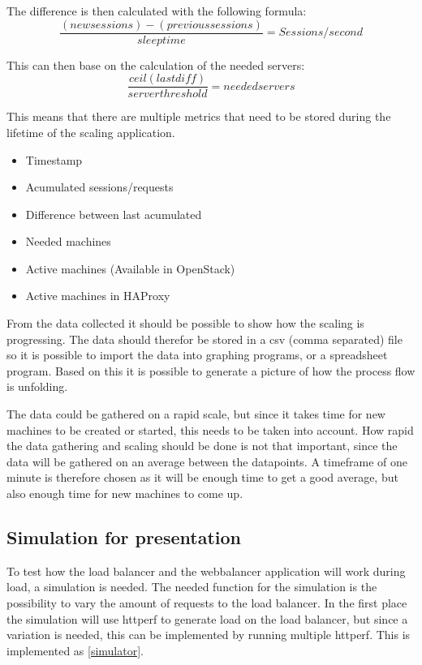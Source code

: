 The difference is then calculated with the following formula:
\begin{equation}
\frac{(newsessions) - (previoussessions)}{sleeptime} =
Sessions/second
\end{equation}

This can then base on the calculation of the needed servers:
\begin{equation}
\frac{ceil(lastdiff)}{server threshold} = needed servers
\end{equation}

This means that there are multiple metrics that need to be stored during the
lifetime of the scaling application.
\begin{itemize}
\item Timestamp
\item Acumulated sessions/requests
\item Difference between last acumulated
\item Needed machines
\item Active machines (Available in OpenStack)
\item Active machines in HAProxy
\end{itemize}

From the data collected it should be possible to show how the scaling is
progressing. The data should therefor be stored in a csv (comma separated)
file so it is possible to import the data into graphing programs, or a
spreadsheet program. Based on this it is possible to generate a picture of how
the process flow is unfolding.

The data could be gathered on a rapid scale, but since it takes time for new
machines to be created or started, this needs to be taken into account. How
rapid the data gathering and scaling should be done is not that important,
since the data will be gathered on an average between the datapoints. A
timeframe of one minute is therefore chosen as it will be enough time to get a
good average, but also enough time for new machines to come up.

\subsection{Simulation for presentation}
To test how the load balancer and the webbalancer application will work during
load, a simulation is needed. The needed function for the simulation is the
possibility to vary the amount of requests to the load balancer. In the first
place the simulation will use httperf to generate load on the load balancer,
but since a variation is needed, this can be implemented by running multiple
httperf. This is implemented as \ref{simulator}.

